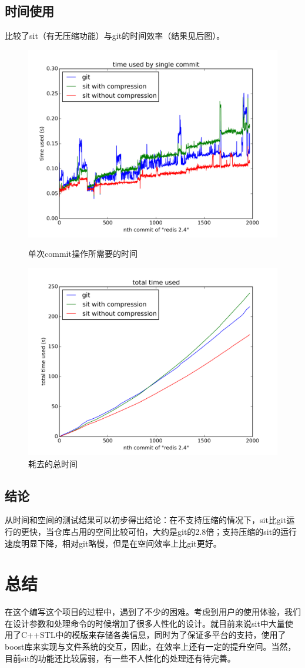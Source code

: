 \documentclass[11pt, a4paper, UTF8]{ctexart}
\begin{document}
\subsection{时间使用}
比较了sit（有无压缩功能）与git的时间效率（结果见后图）。
\begin{figure}[h!]
	\centering
	\includegraphics[scale=0.7]{figure_1.png}
	\caption{单次commit操作所需要的时间}
	\centering
	\includegraphics[scale=0.7]{figure_2.png}
	\caption{耗去的总时间}
\end{figure}
\subsection{结论}
从时间和空间的测试结果可以初步得出结论：在不支持压缩的情况下，sit比git运行的更快，当仓库占用的空间比较可怕，大约是git的2.8倍；支持压缩的sit的运行速度明显下降，相对git略慢，但是在空间效率上比git更好。

\section{总结}
在这个编写这个项目的过程中，遇到了不少的困难。考虑到用户的使用体验，我们在设计参数和处理命令的时候增加了很多人性化的设计。就目前来说sit中大量使用了C++STL中的模版来存储各类信息，同时为了保证多平台的支持，使用了boost库来实现与文件系统的交互，因此，在效率上还有一定的提升空间。当然，目前sit的功能还比较孱弱，有一些不人性化的处理还有待完善。
\end{document}
